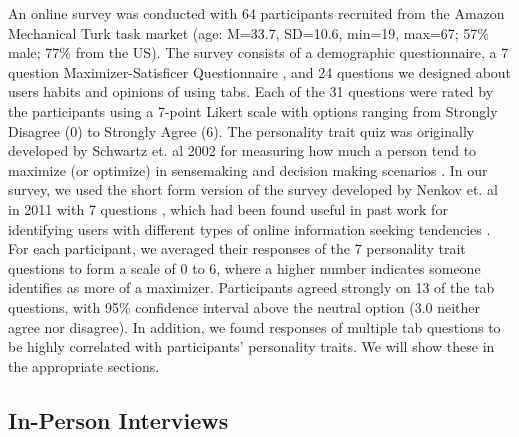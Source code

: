An online survey was conducted with 64 participants recruited from the Amazon Mechanical Turk task market (age: M=33.7, SD=10.6, min=19, max=67; 57\% male; 77\% from the US). The survey consists of a demographic questionnaire, a 7 question Maximizer-Satisficer Questionnaire \cite{nenkov2008short}, and 24 questions we designed about users habits and opinions of using tabs. Each of the 31 questions were rated by the participants using a 7-point Likert scale with options ranging from Strongly Disagree (0) to Strongly Agree (6).  The personality trait quiz was originally developed by Schwartz et. al 2002 for measuring how much a person tend to maximize (or optimize) in sensemaking and decision making scenarios \cite{schwartz2002maximizing}. In our survey, we used the short form version of the survey developed by Nenkov et. al in 2011 with 7 questions \cite{nenkov2008short}, which had been found useful in past work for identifying users with different types of online information seeking tendencies \cite{kittur2013costs}. For each participant, we averaged their responses of the 7 personality trait questions to form a scale of 0 to 6, where a higher number indicates someone identifies as more of a maximizer. Participants agreed strongly on 13 of the tab questions, with 95\% confidence interval above the neutral option (3.0 neither agree nor disagree). In addition, we found responses of multiple tab questions to be highly correlated with participants' personality traits. We will show these in the appropriate sections.

\subsection{In-Person Interviews}

